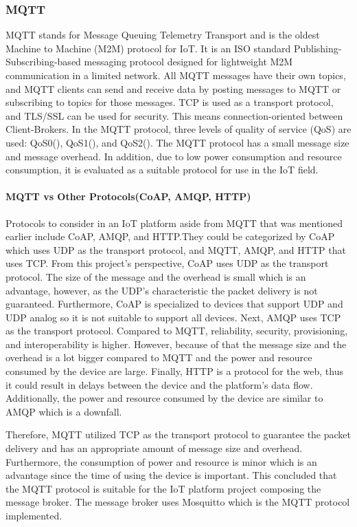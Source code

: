 \documentclass[conference]{IEEEtran}
\begin{document}
\subsubsection{MQTT}
MQTT stands for Message Queuing Telemetry Transport and is the oldest Machine to Machine (M2M) protocol for IoT. It is an ISO standard Publishing-Subscribing-based messaging protocol designed for lightweight M2M communication in a limited network. All MQTT messages have their own topics, and MQTT clients can send and receive data by posting messages to MQTT  or subscribing to topics for those messages. TCP is used as a transport protocol, and TLS/SSL can be used for security. This means connection-oriented between Client-Brokers. In the MQTT protocol, three levels of quality of service (QoS) are used: QoS0(), QoS1(), and QoS2(). The MQTT protocol has a small message size and message overhead. In addition, due to low power consumption and resource consumption, it is evaluated as a suitable protocol for use in the IoT field.
\cite{b21}

\paragraph{MQTT vs Other Protocols(CoAP, AMQP, HTTP)}
\hfill \break
Protocols to consider in an IoT platform aside from MQTT that was mentioned earlier include
CoAP, AMQP, and HTTP.They could be categorized by CoAP which uses UDP as the transport protocol, and MQTT, AMQP, and HTTP that uses TCP. From this project’s perspective, CoAP uses UDP as the transport protocol. The size of the message and the overhead is small which is an advantage, however, as the UDP’s characteristic the packet delivery is not guaranteed. Furthermore, CoAP is specialized to devices that support UDP and UDP analog so it is not suitable to support all devices. Next, AMQP uses TCP as the transport protocol. Compared to MQTT, reliability, security, provisioning, and interoperability is higher. However, because of that the message size and the overhead is a lot bigger compared to MQTT and the power and resource consumed by the device are large. Finally, HTTP is a protocol for the web, thus it could result in delays between the device and the platform’s data flow. Additionally, the power and resource consumed by the device are similar to AMQP which is a downfall.

Therefore, MQTT utilized TCP as the transport protocol to guarantee the packet delivery and has an appropriate amount of message size and overhead. Furthermore, the consumption of power and resource is minor which is an advantage since the time of using the device is important.
This concluded that the MQTT protocol is suitable for the IoT platform project composing the
message broker. The message broker uses Mosquitto which is the MQTT protocol implemented.\cite{b21} 
\end{document}
